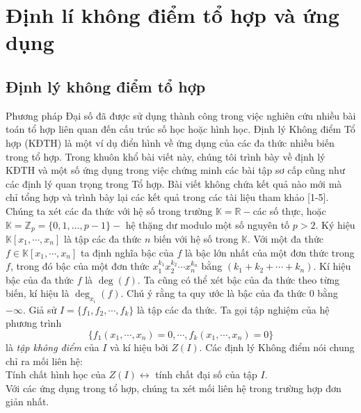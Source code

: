 \section{Định lí không điểm tổ hợp và ứng dụng}
\begin{center}
	\textbf{\color{violet}{Vũ Thế Khôi- Tạp chí Pi tháng 1 năm 2017}}
\end{center}
\subsection{Định lý không điểm tổ hợp}
\noindent Phương pháp Đại số đã được sử dụng thành công trong việc nghiên cứu nhiều bài toán tổ hợp liên quan đến cấu trúc số học hoặc hình học. Định lý Không điểm Tổ hợp (KĐTH) là một ví dụ điển hình về ứng dụng của các đa thức nhiều biến trong tổ hợp.
Trong khuôn khổ bài viết này, chúng tôi trình bày về định lý KĐTH và một số ứng dụng trong việc chứng minh các bài tập sơ cấp cũng như các định lý quan trọng trong Tổ hợp. Bài viết không chứa kết quả nào mới mà chỉ tổng hợp và trình bày lại các kết quả trong các tài liệu tham khảo [1-5].
Chúng ta xét các đa thức với hệ số trong trường $\mathbb{K}= \mathbb{R}-$các số thực, hoặc  $\mathbb{K}= \mathbb{Z}_p = \{ 0,1, \dots , p-1\}-$ hệ thặng dư modulo một số nguyên tố $p>2$. Ký hiệu $\mathbb{K}[x_1, \cdots, x_n]$ là tập các đa thức $n$ biến với hệ số trong $\mathbb{K}$. Với một đa thức $f\in \mathbb{K}[x_1, \cdots, x_n]$ ta định nghĩa bậc của $f$ là bậc lớn nhất của một đơn thức trong $f$, trong đó bậc của một đơn thức $x_1^{k_1}x_2^{k_2}\cdots x_n^{k_n}$ bằng $\left(k_1+k_2+\cdots + k_n\right)$. Kí hiệu bậc của đa thức $f$ là $\deg (f)$. Ta cũng có thể xét bậc của đa thức theo từng biến, kí hiệu là $\deg_{x_i}(f)$. Chú ý rằng ta quy ước là bậc của đa thức $0$ bằng $- \infty$.
Giả sử $I=\{ f_1,f_2, \cdots, f_k\}$ là tập các đa thức. Ta gọi tập nghiệm của hệ phương trình 
$$\{ f_1(x_1,\cdots , x_n)=0, \cdots ,f_k(x_1,\cdots , x_n)=0 \}$$ là {\it {tập không điểm}} của $I$ và kí hiệu bởi $Z(I)$. Các định lý Không điểm nói chung chỉ ra mối liên hệ:\\
Tính chất hình học của $Z(I) \longleftrightarrow $ tính chất đại số của tập $I$.\\
Với các ứng dụng trong tổ hợp, chúng ta xét mối liên hệ trong trường hợp đơn giản nhất.\\
